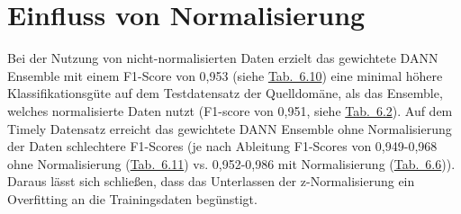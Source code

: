 \section{Einfluss von Normalisierung}\label{sec:disknorm}

Bei der Nutzung von nicht-normalisierten Daten erzielt das gewichtete \gls{DANN} Ensemble mit einem F1-Score von 0,953 (siehe \hyperref[tab:Ergebnisse_indomain_notnorm]{Tab.~6.10}) eine minimal höhere Klassifikationsgüte auf dem Testdatensatz der Quelldomäne, als das Ensemble, welches normalisierte Daten nutzt (F1-score von 0,951, siehe \hyperref[tab:Ergebnisse_indomain]{Tab.~6.2}). Auf dem Timely Datensatz erreicht das gewichtete \gls{DANN} Ensemble ohne Normalisierung der Daten schlechtere F1-Scores (je nach Ableitung F1-Scores von 0,949-0,968 ohne Normalisierung (\hyperref[tab:Ergebnisse_timely_notnorm]{Tab.~6.11}) vs. 0,952-0,986 mit Normalisierung (\hyperref[tab:Ergebnisse_timely]{Tab.~6.6})). Daraus lässt sich schließen, dass das Unterlassen der z-Normalisierung ein Overfitting an die Trainingsdaten begünstigt. 